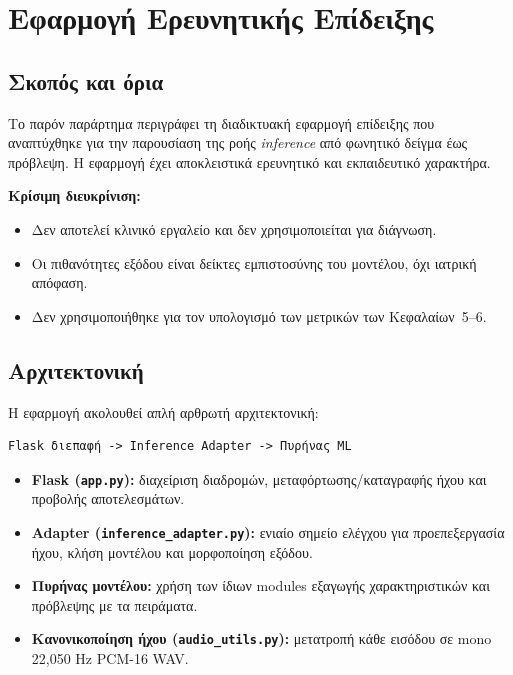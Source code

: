 
\chapter{Εφαρμογή Ερευνητικής Επίδειξης}
\label{ch:demo-app}

\section{Σκοπός και όρια}

Το παρόν παράρτημα περιγράφει τη διαδικτυακή εφαρμογή επίδειξης που αναπτύχθηκε για την παρουσίαση της ροής \textit{inference} από φωνητικό δείγμα έως πρόβλεψη. Η εφαρμογή έχει αποκλειστικά ερευνητικό και εκπαιδευτικό χαρακτήρα.

\textbf{Κρίσιμη διευκρίνιση:}
\begin{itemize}
    \item Δεν αποτελεί κλινικό εργαλείο και δεν χρησιμοποιείται για διάγνωση.
    \item Οι πιθανότητες εξόδου είναι δείκτες εμπιστοσύνης του μοντέλου, όχι ιατρική απόφαση.
    \item Δεν χρησιμοποιήθηκε για τον υπολογισμό των μετρικών των Κεφαλαίων~5--6.
\end{itemize}

\section{Αρχιτεκτονική}

Η εφαρμογή ακολουθεί απλή αρθρωτή αρχιτεκτονική:

\begin{verbatim}
Flask διεπαφή -> Inference Adapter -> Πυρήνας ML
\end{verbatim}

\begin{itemize}
    \item \textbf{Flask (\texttt{app.py}):} διαχείριση διαδρομών, μεταφόρτωσης/καταγραφής ήχου και προβολής αποτελεσμάτων.
    \item \textbf{Adapter (\texttt{inference\_adapter.py}):} ενιαίο σημείο ελέγχου για προεπεξεργασία ήχου, κλήση μοντέλου και μορφοποίηση εξόδου.
    \item \textbf{Πυρήνας μοντέλου:} χρήση των ίδιων modules εξαγωγής χαρακτηριστικών και πρόβλεψης με τα πειράματα.
    \item \textbf{Κανονικοποίηση ήχου (\texttt{audio\_utils.py}):} μετατροπή κάθε εισόδου σε mono 22{,}050 Hz PCM-16 WAV.
\end{itemize}

